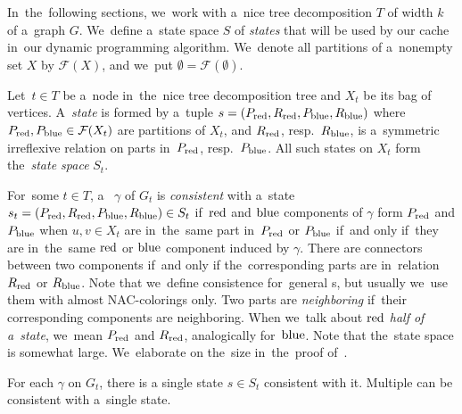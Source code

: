 In~the~following sections,
we~work with a~nice tree decomposition \( T \) of width \( k \)
of a~graph \( G \).
%
We~define a~state space \( S \) of \emph{states}
that will be used by our cache in~our dynamic programming algorithm.
We~denote all partitions of a~nonempty set \( X \) by \( \mathcal{F}(X) \),
and we~put \( \emptyset = \mathcal{F}(\emptyset) \).

%
\begin{definition}
	Let~\( t \in T \) be a~node in~the~nice tree decomposition tree and
	\( X_t \) be its bag of vertices.
	A~\emph{state} is formed by a~tuple \( s = (P_{\text{red}}, R_{\text{red}}, P_{\text{blue}}, R_{\text{blue}}) \)
	where \( P_{\text{red}}, P_{\text{blue}} \in \mathcal{F}(X_t)\) are partitions of \( X_t \),
	and \( R_{\text{red}}\), resp.\ \(R_{\text{blue}} \), is a~symmetric irreflexive relation
	on parts in~\( P_{\text{red}}\), resp.\ \(P_{\text{blue}} \).
	All such states on \( X_t \) form the~\emph{state space} \( S_t \).
\end{definition}
%
For~some \( t \in T \), a~\rbcol{} \( \gamma \) of \( G_t \)
is \emph{consistent} with a~state \( s_t = (P_{\text{red}}, R_{\text{red}}, P_{\text{blue}}, R_{\text{blue}}) \in S_t \)
if~\( \text{red} \) and \( \text{blue} \) components of \( \gamma \) form \( P_{\text{red}} \) and \( P_{\text{blue}} \)
when \( u, v \in X_t \) are in~the~same part in~\( P_{\text{red}} \) or \( P_{\text{blue}} \)
if~and only if~they are in~the~same \( \text{red} \) or \( \text{blue} \) component induced by \( \gamma \).
There are connectors between two components if~and only if
the~corresponding parts are in~relation \( R_{\text{red}} \) or \( R_{\text{blue}} \).
%
Note that we~define consistence for~general \rbcol{}s,
but usually we~use them with almost NAC-colorings only.
%
Two parts are \emph{neighboring} if~their corresponding components are neighboring.
When we~talk about \emph{\( \text{red} \) half of a~state},
we~mean \( P_{\text{red}} \) and \( R_{\text{red}} \),
analogically for~\( \text{blue} \).
%
Note that the~state space is somewhat large.
We~elaborate on the~size in~the~proof of~.
%
\begin{observation}
	For each \rbcol{} \( \gamma \) on \( G_t \),
	there is a single state \( s \in S_t \) consistent with it.
	Multiple \rbcol{} can be consistent with a~single state.
\end{observation}
%

